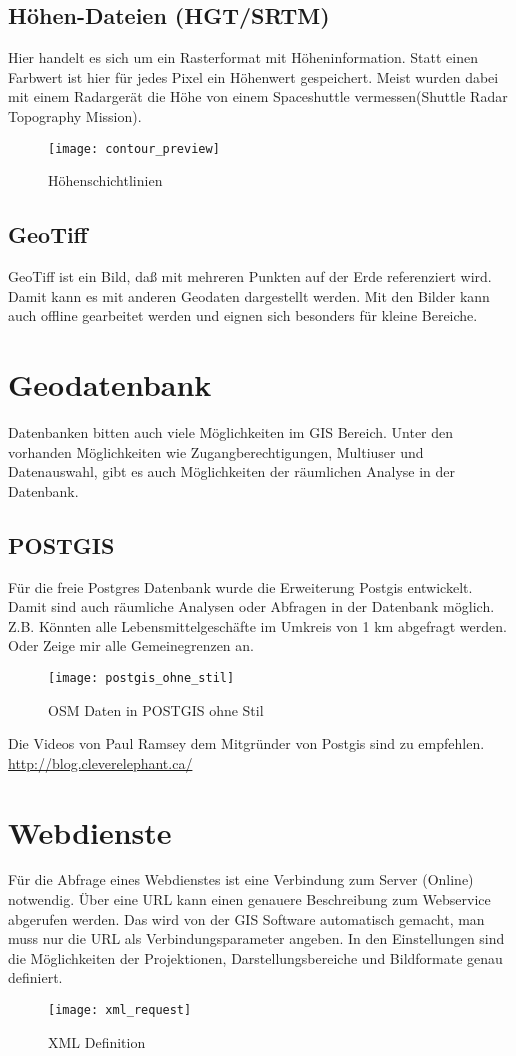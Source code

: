 \documentclass[11pt,fleqn]{book} %
\begin{document}
\subsection{H\"ohen-Dateien (HGT/SRTM)}
Hier handelt es sich um ein Rasterformat mit H\"oheninformation. Statt einen Farbwert ist hier f\"ur jedes Pixel ein H\"ohenwert gespeichert. Meist wurden dabei mit einem Radarger\"at die H\"ohe von einem Spaceshuttle vermessen(Shuttle Radar Topography Mission). 
\begin{figure}[h]
\centering\texttt{[image: contour\_preview]}
\caption{H\"ohenschichtlinien}
\end{figure}


\subsection{GeoTiff}
GeoTiff ist ein Bild, da{\ss} mit mehreren Punkten auf der Erde referenziert wird. Damit kann es mit anderen Geodaten dargestellt werden. Mit den Bilder kann auch offline gearbeitet werden und eignen sich besonders f\"ur kleine Bereiche. 

\section{Geodatenbank}
Datenbanken bitten auch viele M\"oglichkeiten im GIS Bereich. Unter den vorhanden M\"oglichkeiten wie Zugangberechtigungen, Multiuser und Datenauswahl, gibt es auch Möglichkeiten der r\"aumlichen Analyse in der Datenbank. 

\subsection{POSTGIS}
F\"ur die freie Postgres Datenbank wurde die Erweiterung Postgis entwickelt. Damit sind auch r\"aumliche Analysen oder Abfragen in der Datenbank m\"oglich. Z.B. K\"onnten alle Lebensmittelgesch\"afte im Umkreis von 1 km abgefragt werden. Oder Zeige mir alle Gemeinegrenzen an.    
\begin{figure}[h]
\centering\texttt{[image: postgis\_ohne\_stil]}
\caption{OSM Daten in POSTGIS ohne Stil}
\end{figure}
Die Videos von Paul Ramsey dem Mitgr\"under von Postgis sind zu empfehlen. \url{http://blog.cleverelephant.ca/}

\section{Webdienste}
F\"ur die Abfrage eines Webdienstes ist eine Verbindung zum Server (Online) notwendig. \"Uber eine URL kann einen genauere Beschreibung zum Webservice abgerufen werden. Das wird von der GIS Software automatisch gemacht, man muss nur die URL als Verbindungsparameter angeben. In den Einstellungen sind die Möglichkeiten der Projektionen, Darstellungsbereiche und Bildformate genau definiert. 
\begin{figure}[h]
\centering\texttt{[image: xml\_request]}
\caption{XML Definition}
\end{figure}
\end{document}
